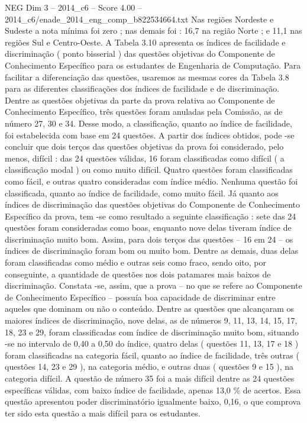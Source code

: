 \begin{textsample}{NEG Dim 3 – 2014\_c6 – Score 4.00 – 2014\_c6/enade\_2014\_eng\_comp\_b822534664.txt}
Nas regiões Nordeste e Sudeste a nota mínima foi zero ; nas demais foi : 16,7 na região Norte ; e 11,1 nas regiões Sul e Centro-Oeste.
A Tabela 3.10 apresenta os índices de facilidade e discriminação ( ponto bisserial ) das questões objetivas do Componente de Conhecimento Específico para os estudantes de Engenharia de Computação.
Para facilitar a diferenciação das questões, usaremos as mesmas cores da Tabela 3.8 para as diferentes classificações dos índices de facilidade e de discriminação.
Dentre as questões objetivas da parte da prova relativa ao Componente de Conhecimento Específico, três questões foram anuladas pela Comissão, as de número 27, 30 e 34.
Desse modo, a classificação, quanto ao índice de facilidade, foi estabelecida com base em 24 questões.
A partir dos índices obtidos, pode -se concluir que dois terços das questões objetivas da prova foi considerado, pelo menos, difícil : das 24 questões válidas, 16 foram classificadas como difícil ( a classificação modal ) ou como muito difícil.
Quatro questões foram classificadas como fácil, e outras quatro consideradas com índice médio.
Nenhuma questão foi classificada, quanto ao índice de facilidade, como muito fácil.
Já quanto aos índices de discriminação das questões objetivas do Componente de Conhecimento Específico da prova, tem -se como resultado a seguinte classificação : sete das 24 questões foram consideradas como boas, enquanto nove delas tiveram índice de discriminação muito bom.
Assim, para dois terços das questões – 16 em 24 – os índices de discriminação foram bom ou muito bom.
Dentre as demais, duas delas foram classificadas como médio e outras seis como fraco, sendo oito, por conseguinte, a quantidade de questões nos dois patamares mais baixos de discriminação.
Constata -se, assim, que a prova – no que se refere ao Componente de Conhecimento Específico – possuía boa capacidade de discriminar entre aqueles que dominam ou não o conteúdo.
Dentre as questões que alcançaram os maiores índices de discriminação, nove delas, as de números 9, 11, 13, 14, 15, 17, 18, 23 e 29, foram classificadas com índice de discriminação muito bom, situando -se no intervalo de 0,40 a 0,50 do índice, quatro delas ( questões 11, 13, 17 e 18 ) foram classificadas na categoria fácil, quanto ao índice de facilidade, três outras ( questões 14, 23 e 29 ), na categoria médio, e outras duas ( questões 9 e 15 ), na categoria difícil.
A questão de número 35 foi a mais difícil dentre as 24 questões específicas válidas, com baixo índice de facilidade, apenas 13,0 \% de acertos.
Essa questão apresentou poder discriminatório igualmente baixo, 0,16, o que comprova ter sido esta questão a mais difícil para os estudantes.

\end{textsample}
